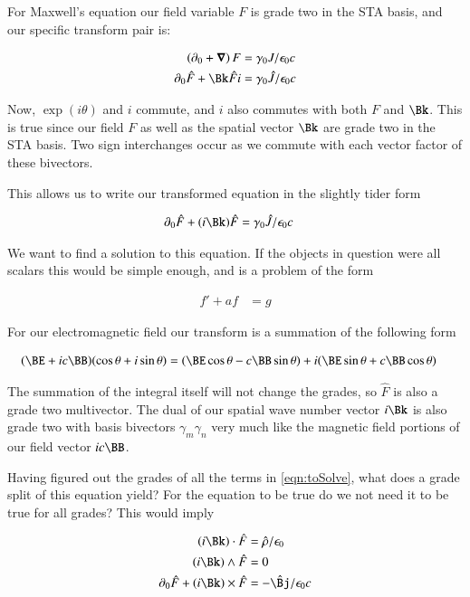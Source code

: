 \documentclass{article}
\begin{document}
For Maxwell's equation our field variable $F$ is grade two in the STA basis, and our specific transform pair is:

\begin{align}
\left(\partial_0 + \spacegrad \right) F &= \gamma_0 J/\epsilon_0 c \\
\partial_0 \hat{F} + \Bk \hat{F} i &= \gamma_0 \hat{J}/ \epsilon_0 c
\end{align}

Now, $\exp(i\theta)$ and $i$ commute, and $i$ also commutes with both $F$ and $\Bk$.  This is true since our field $F$ as well as the spatial vector $\Bk$ are grade two in the STA basis.  
Two sign interchanges occur as we commute with each vector factor of these
bivectors.

This allows us to write our transformed equation in the slightly tider form

\begin{align}\label{eqn:toSolve}
\partial_0 \hat{F} + (i \Bk) \hat{F} &= \gamma_0 \hat{J}/ \epsilon_0 c
\end{align}

We want to find a solution to this equation.  If the objects in question were all scalars this would be simple enough, and is a problem of the form

\begin{align}\label{eqn:firstOrder}
f' + a f &= g
\end{align}

For our electromagnetic field our transform is a summation of the following 
form

\begin{align*}
(\BE + i c \BB) (\cos\theta + i \sin\theta)
&=
(\BE \cos\theta - c \BB \sin\theta) + 
i (\BE \sin\theta + c \BB \cos\theta)
\end{align*}

The summation of the integral itself will not change the grades, so $\hat{F}$
is also a grade two multivector.  The dual of our spatial wave number
vector $i\Bk$ is also grade two with basis bivectors $\gamma_m \gamma_n$ very 
much like the magnetic field portions of our field vector $i c \BB$.

Having figured out the grades of all the terms in \ref{eqn:toSolve}, what
does a grade split of this equation yield?  For the equation to be true
do we not need it to be true for all grades?  This would imply

\begin{align*}
(i \Bk) \cdot \hat{F} &= \hat{\rho}/ \epsilon_0 \\
(i \Bk) \wedge \hat{F} &= 0 \\
\partial_0 \hat{F} + (i \Bk) \times \hat{F} &= -\hat{\Bj}/ \epsilon_0 c
\end{align*}
\end{document}
